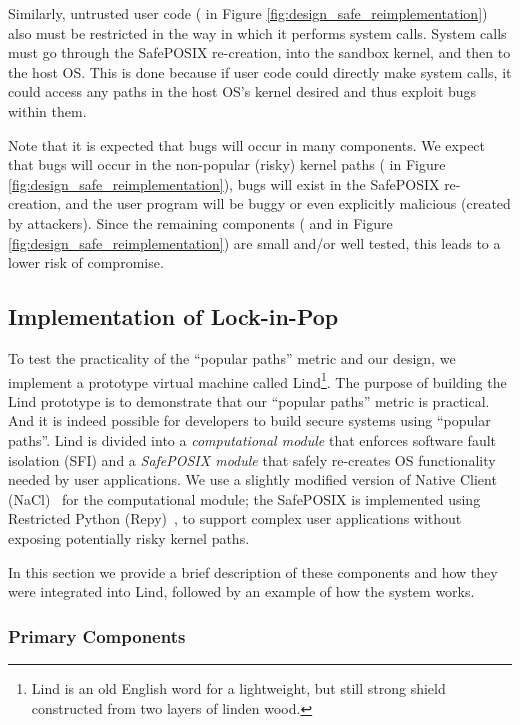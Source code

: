 Similarly, untrusted user code ( in Figure \ref{fig:design_safe_reimplementation}) also must be restricted in the way
in which it performs system calls.
System calls must go through the SafePOSIX re-creation, into the sandbox kernel, and then to the host OS.
This is done because if user code could directly make system calls, it could access any paths in the host OS's kernel desired
and thus exploit bugs within them.

Note that it is expected that bugs will occur in many components.
We expect that bugs will occur in the non-popular (risky) kernel paths ( in Figure \ref{fig:design_safe_reimplementation}),
bugs will exist in the SafePOSIX re-creation, and the user program will be buggy or even explicitly malicious (created by attackers).
Since the remaining components ( and  in Figure \ref{fig:design_safe_reimplementation})
are small and/or well tested, this leads to a lower risk of compromise.

\subsection{Implementation of Lock-in-Pop}

To test the practicality of the ``popular paths'' metric and our \lip design, 
we implement a prototype virtual machine
called Lind\footnote{\scriptsize Lind is an old English word for a lightweight, but still strong shield
constructed from two layers of linden wood.}. The purpose of building the Lind prototype is to demonstrate that 
our ``popular paths'' metric is practical. And it is indeed possible for developers to build secure systems using 
``popular paths''. 
Lind is divided into a \emph{computational module} that enforces software fault isolation (SFI) and a
\emph{SafePOSIX module} that safely re-creates OS functionality needed by user
applications.  We use a slightly modified version of Native Client
(NaCl)~\cite{NaCl-09} for the computational module; the SafePOSIX is
implemented using Restricted Python (Repy)~\cite{Repy-10}, to support
complex user applications without exposing potentially risky kernel paths.

In this section we provide a brief description of these components and how they
were integrated into Lind, followed by an example of how the system works.

\subsubsection{Primary Components}

